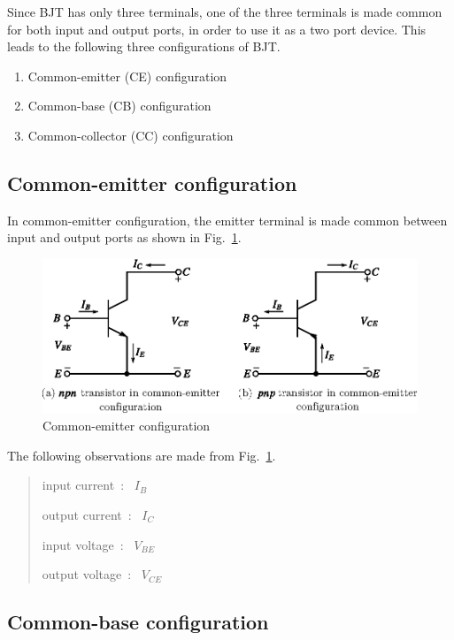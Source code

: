 Since BJT has only three terminals, one of the three terminals is made common for both input and output ports, in order to use it as a two port device. This leads to the following three configurations of BJT.
\begin{enumerate}
\item Common-emitter (CE) configuration

\item Common-base (CB) configuration

\item Common-collector (CC) configuration
\end{enumerate}

\subsection{Common-emitter configuration}\label{sec3.13.1}

In common-emitter configuration, the emitter terminal is made common between input and output ports as shown in Fig.~\ref{fig3.14}.
\begin{figure}[H]
\centering
\includegraphics{chap2/fig2.14.eps}
\caption{Common-emitter configuration}\label{fig3.14}
\end{figure}

\eject

The following observations are made from Fig.~\ref{fig3.14}.
\begin{quote}
input current~:~ $I_{B}$

output current~:~ $I_{C}$

input voltage~:~ $V_{BE}$

output voltage~:~ $V_{CE}$
\end{quote}

\subsection{Common-base configuration}\label{sec3.13.2}

